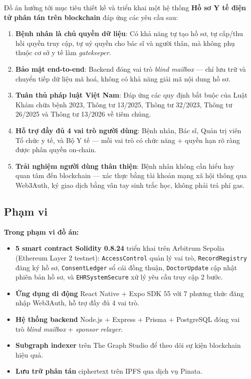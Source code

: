\documentclass[../DoAn]{subfiles}
\begin{document}
Đồ án hướng tới mục tiêu thiết kế và triển khai một hệ thống \textbf{Hồ sơ Y tế điện tử phân tán trên blockchain} đáp ứng các yêu cầu sau:

\begin{enumerate}
    \item \textbf{Bệnh nhân là chủ quyền dữ liệu}: Có khả năng tự tạo hồ sơ, tự cấp/thu hồi quyền truy cập, tự uỷ quyền cho bác sĩ và người thân, mà không phụ thuộc cơ sở y tế làm \textit{gatekeeper}.
    \item \textbf{Bảo mật end-to-end}: Backend đóng vai trò \textit{blind mailbox} --- chỉ lưu trữ và chuyển tiếp dữ liệu mã hoá, không có khả năng giải mã nội dung hồ sơ.
    \item \textbf{Tuân thủ pháp luật Việt Nam}: Đáp ứng các quy định bắt buộc của Luật Khám chữa bệnh 2023, Thông tư 13/2025, Thông tư 32/2023, Thông tư 26/2025 và Thông tư 13/2026 về tiêm chủng.
    \item \textbf{Hỗ trợ đầy đủ 4 vai trò người dùng}: Bệnh nhân, Bác sĩ, Quản trị viên Tổ chức y tế, và Bộ Y tế --- mỗi vai trò có chức năng + quyền hạn rõ ràng được phân quyền on-chain.
    \item \textbf{Trải nghiệm người dùng thân thiện}: Bệnh nhân không cần hiểu hay quan tâm đến blockchain --- xác thực bằng tài khoản mạng xã hội thông qua Web3Auth, ký giao dịch bằng vân tay sinh trắc học, không phải trả phí gas.
\end{enumerate}

\subsection*{Phạm vi}

\textbf{Trong phạm vi đồ án:}
\begin{itemize}
    \item \textbf{5 smart contract Solidity 0.8.24} triển khai trên Arbitrum Sepolia (Ethereum Layer 2 testnet): \texttt{AccessControl} quản lý vai trò, \texttt{RecordRegistry} đăng ký hồ sơ, \texttt{ConsentLedger} sổ cái đồng thuận, \texttt{DoctorUpdate} cập nhật phiên bản hồ sơ, và \texttt{EHRSystemSecure} xử lý yêu cầu truy cập 2 bước.
    \item \textbf{Ứng dụng di động} React Native + Expo SDK 55 với 7 phương thức đăng nhập Web3Auth, hỗ trợ đầy đủ 4 vai trò.
    \item \textbf{Hệ thống backend} Node.js + Express + Prisma + PostgreSQL đóng vai trò \textit{blind mailbox} + \textit{sponsor relayer}.
    \item \textbf{Subgraph indexer} trên The Graph Studio để theo dõi sự kiện blockchain hiệu quả.
    \item \textbf{Lưu trữ phân tán} ciphertext trên IPFS qua dịch vụ Pinata.
\end{itemize}
\end{document}
